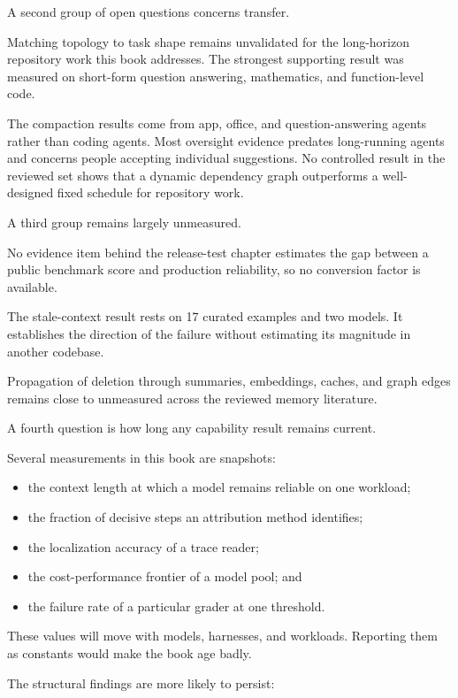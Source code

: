 A second group of open questions concerns transfer.

Matching topology to task shape remains unvalidated for the long-horizon repository work this book addresses. The strongest supporting result was measured on short-form question answering, mathematics, and function-level code.

The compaction results come from app, office, and question-answering agents rather than coding agents. Most oversight evidence predates long-running agents and concerns people accepting individual suggestions. No controlled result in the reviewed set shows that a dynamic dependency graph outperforms a well-designed fixed schedule for repository work.

A third group remains largely unmeasured.

No evidence item behind the release-test chapter estimates the gap between a public benchmark score and production reliability, so no conversion factor is available.

The stale-context result rests on 17 curated examples and two models. It establishes the direction of the failure without estimating its magnitude in another codebase.

Propagation of deletion through summaries, embeddings, caches, and graph edges remains close to unmeasured across the reviewed memory literature.

A fourth question is how long any capability result remains current.

Several measurements in this book are snapshots:

\begin{itemize}
\tightlist
\item
  the context length at which a model remains reliable on one workload;
\item
  the fraction of decisive steps an attribution method identifies;
\item
  the localization accuracy of a trace reader;
\item
  the cost-performance frontier of a model pool; and
\item
  the failure rate of a particular grader at one threshold.
\end{itemize}

These values will move with models, harnesses, and workloads. Reporting them as constants would make the book age badly.

The structural findings are more likely to persist:

